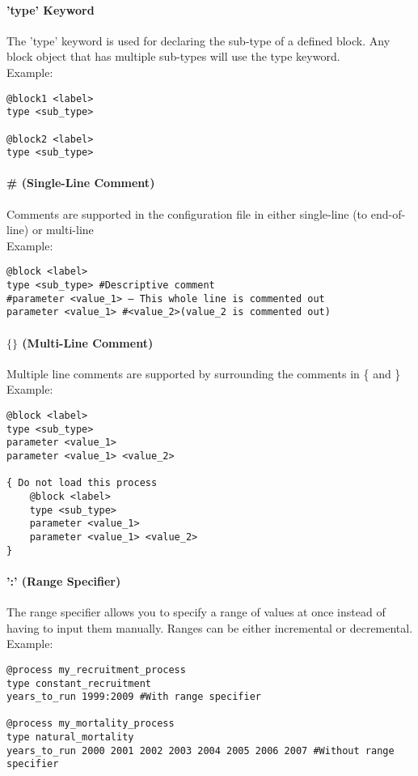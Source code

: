\paragraph*{'type' Keyword}
The 'type' keyword is used for declaring the sub-type of a defined block. Any block object that has multiple sub-types will use the type keyword.\\
Example:
{\small{\begin{verbatim}
@block1 <label>
type <sub_type>

@block2 <label>
type <sub_type>
\end{verbatim}}}

\paragraph*{\# (Single-Line Comment)}
Comments are supported in the configuration file in either single-line (to end-of-line) or multi-line\\
Example:
{\small{\begin{verbatim}
@block <label>
type <sub_type> #Descriptive comment
#parameter <value_1> – This whole line is commented out
parameter <value_1> #<value_2>(value_2 is commented out)
\end{verbatim}}}

\paragraph*{$\{ \}$ (Multi-Line Comment)}
Multiple line comments are supported by surrounding the comments in \{ and \}\\
Example:
{\small{\begin{verbatim}
@block <label>
type <sub_type>
parameter <value_1>
parameter <value_1> <value_2>

{ Do not load this process
	@block <label>
	type <sub_type>
	parameter <value_1>
	parameter <value_1> <value_2>
}
\end{verbatim}}}

\paragraph*{':' (Range Specifier)}
The range specifier allows you to specify a range of values at once instead of having to input them manually. Ranges can be either incremental or decremental.\\
Example:
{\small{\begin{verbatim}
@process my_recruitment_process
type constant_recruitment
years_to_run 1999:2009 #With range specifier

@process my_mortality_process
type natural_mortality
years_to_run 2000 2001 2002 2003 2004 2005 2006 2007 #Without range specifier
\end{verbatim}}}

